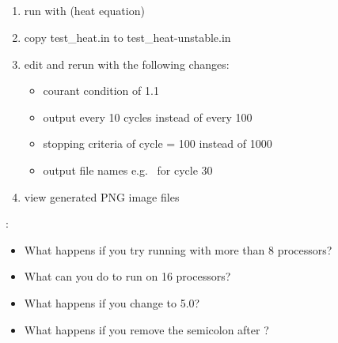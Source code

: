 \NEWSEC

\subsection{\ssParamActivity}

\begin{frame}[fragile,label=ss-param-activity] 
\secframetitle{\ssParamActivity}
  \begin{enumerate}
  \item run  with  (heat equation)
  \item copy test\_heat.in to test\_heat-unstable.in
  \item edit and rerun with the following changes:
    \begin{itemize}
    \item courant condition of 1.1
    \item output every 10 cycles instead of every 100
    \item stopping criteria of cycle = 100 instead of 1000
    \item output file names e.g.~ for cycle 30
    \end{itemize}
  \item view generated PNG image files
  \end{enumerate}
\footnotesize
{}:
  \begin{itemize}
\item What happens if you try running  with more than 8 processors?
\item What can you do to run on 16 processors?
\item What happens if you change  to 5.0?
\item What happens if you remove the semicolon after ?
  \end{itemize}
\end{frame}

